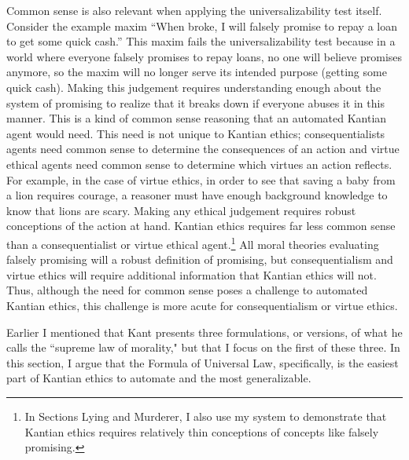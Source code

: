 \begin{isabellebody}
\begin{isamarkuptext}
Common sense is also relevant when applying the universalizability test itself. Consider the example
maxim ``When broke, I will falsely promise to repay a loan
to get some quick cash.'' This maxim fails the universalizability test because in a world where everyone
falsely promises to repay loans, no one will believe promises anymore, so the maxim will no longer serve
its intended purpose (getting some quick cash). Making this judgement requires understanding enough about
the system of promising to realize that it breaks down if everyone abuses it in this manner. This is a
kind of common sense reasoning that an automated Kantian agent would need. This need is not unique to
Kantian ethics; consequentialists agents need common sense to determine the consequences of 
an action and virtue ethical agents need common sense to determine which virtues an action
reflects. For example, in the case of virtue ethics, in order to see that saving a baby from a lion 
requires courage, a reasoner must have enough background knowledge to know that lions are scary. Making any 
ethical judgement requires robust conceptions of the action at hand. Kantian ethics requires far less common sense 
than a consequentialist or virtue ethical agent.\footnote{
In Sections Lying and Murderer, I also use my system to demonstrate that Kantian ethics requires relatively thin conceptions 
of concepts like falsely promising.} All
moral theories evaluating falsely promising will a robust definition of promising, 
but consequentialism and virtue ethics will require additional information
that Kantian ethics will not. Thus, although the need for common sense poses a challenge to automated
Kantian ethics, this challenge is more acute for consequentialism or virtue ethics.%
\end{isamarkuptext}\isamarkuptrue%
%
\isadelimdocument
%
\endisadelimdocument
%
\isatagdocument
%
\isamarkuptrue%
%
\endisatagdocument
{\isafolddocument}%
%
\isadelimdocument
%
\endisadelimdocument
%
\begin{isamarkuptext}%
Earlier I mentioned that Kant presents three formulations, or versions, 
of what he calls the ``supreme law of morality," but that I focus on the first of these three. In this section, 
I argue that the Formula of Universal Law, specifically, is the easiest part of Kantian ethics to automate
and the most generalizable.


\end{isamarkuptext}
\end{isabellebody}

